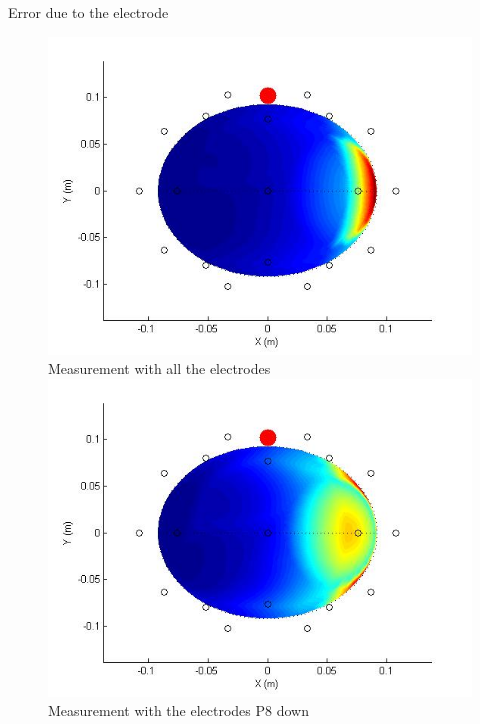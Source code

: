 \documentclass[t,12pt,english
\ifx\beamermode\undefined\else,\beamermode\fi
]{beamer}
\begin{document}
\begin{frame}{Error due to the electrode}

\begin{figure}[!htbp]
%
\centering
\includegraphics[width=1\textwidth]{19.jpg}\\
\tiny{Measurement with all the electrodes}
\endminipage\hfill
{}%
\centering
\includegraphics[width=1\textwidth]{20.jpg}\\
\tiny{Measurement with the electrodes P8 down}
\endminipage\hfill
{}%
\centering

\end{figure}
\end{frame}
\end{document}
